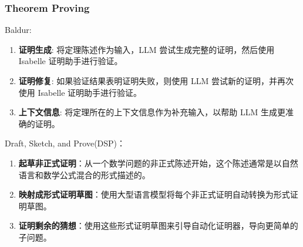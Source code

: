 \begin{frame}
\frametitle{Theorem Proving}
Baldur:
\begin{enumerate}
	\item \textbf{证明生成}: 将定理陈述作为输入，LLM 尝试生成完整的证明，然后使用 Isabelle 证明助手进行验证。
	\item \textbf{证明修复}: 如果验证结果表明证明失败，则使用 LLM 尝试新的证明，并再次使用 Isabelle 证明助手进行验证。
	\item \textbf{上下文信息}: 将定理所在的上下文信息作为补充输入，以帮助 LLM 生成更准确的证明。
\end{enumerate}
\pause
Draft, Sketch, and Prove(DSP)：
\begin{enumerate}
\item \textbf{起草非正式证明}：从一个数学问题的非正式陈述开始，这个陈述通常是以自然语言和数学公式混合的形式描述的。
\item \textbf{映射成形式证明草图}：使用大型语言模型将每个非正式证明自动转换为形式证明草图。
\item \textbf{证明剩余的猜想}：使用这些形式证明草图来引导自动化证明器，导向更简单的子问题。
\end{enumerate}


\end{frame}